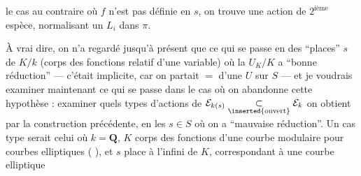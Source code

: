 le cas au contraire où  $f$ n'est pas définie en $s$, on trouve une  action de $2^{\text{ième}}$ espèce, normalisant un $L_i$  dans $\pi$.

À vrai dire, on n'a regardé jusqu'à présent que ce qui se passe en des ``places'' $s$ de $K/k$ (corps des fonctions relatif d'une variable) où la   $U_K/K$ a ``bonne réduction'' --- c'était implicite, car on partait $=$ d'une $U$ sur $S$ --- et je voudrais examiner maintenant ce qui se passe dans le cas où on abandonne cette hypothèse : examiner quels types d'actions de $\mathcal E_{k(s)}\underset{\inserted{\text{ouvert}}}{\subset}\mathcal E_k$ on obtient par la construction précédente, en les $s\in S$ où on a ``mauvaise réduction''. Un cas type serait celui où $k=\mathbf Q$, $K$ corps des fonctions d'une courbe modulaire pour courbes elliptiques ( ), et $s$ place à l'infini de $K$, correspondant à une courbe elliptique
